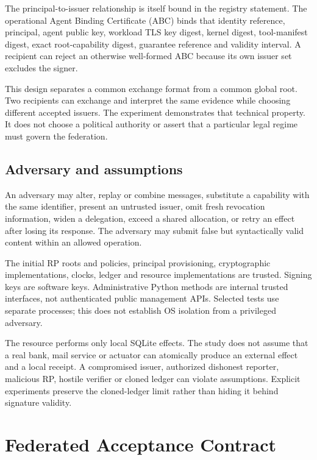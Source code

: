 \documentclass[journal,10pt]{IEEEtran}
\begin{document}
The principal-to-issuer relationship is itself bound in the registry statement. The operational Agent Binding Certificate (ABC) binds that identity reference, principal, agent public key, workload TLS key digest, kernel digest, tool-manifest digest, exact root-capability digest, guarantee reference and validity interval. A recipient can reject an otherwise well-formed ABC because its own issuer set excludes the signer.

This design separates a common exchange format from a common global root. Two recipients can exchange and interpret the same evidence while choosing different accepted issuers. The experiment demonstrates that technical property. It does not choose a political authority or assert that a particular legal regime must govern the federation.

\subsection{Adversary and assumptions}
An adversary may alter, replay or combine messages, substitute a capability with the same identifier, present an untrusted issuer, omit fresh revocation information, widen a delegation, exceed a shared allocation, or retry an effect after losing its response. The adversary may submit false but syntactically valid content within an allowed operation.

The initial RP roots and policies, principal provisioning, cryptographic implementations, clocks, ledger and resource implementations are trusted. Signing keys are software keys. Administrative Python methods are internal trusted interfaces, not authenticated public management APIs. Selected tests use separate processes; this does not establish OS isolation from a privileged adversary.

The resource performs only local SQLite effects. The study does not assume that a real bank, mail service or actuator can atomically produce an external effect and a local receipt. A compromised issuer, authorized dishonest reporter, malicious RP, hostile verifier or cloned ledger can violate assumptions. Explicit experiments preserve the cloned-ledger limit rather than hiding it behind signature validity.

\section{Federated Acceptance Contract}
\end{document}
